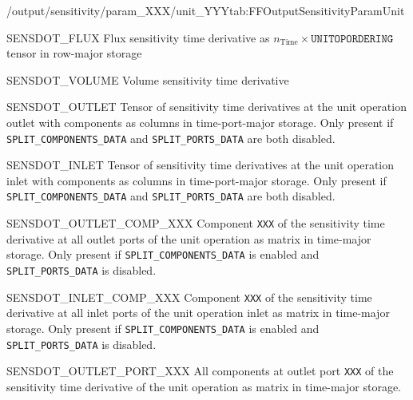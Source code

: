 \begin{groupscope}{/output/sensitivity/param\_XXX/unit\_YYY}{tab:FFOutputSensitivityParamUnit}
  \begin{dataset}[type=double,unit={\si{\mol\per\square\metre\per\square\second\per\ParamUnit}}]{SENSDOT\_FLUX}
    Flux sensitivity time derivative as $n_{\text{Time}} \times \texttt{UNITOPORDERING}$ tensor in row-major storage
  \end{dataset}
  \begin{dataset}[type=double,unit={\si{\cubic\per\second\metre\per\ParamUnit}}]{SENSDOT\_VOLUME}
    Volume sensitivity time derivative 
  \end{dataset}
  \begin{dataset}[type=double,unit={\si{\mol\per\cubic\metre\of{IV}\per\second\per\ParamUnit}}]{SENSDOT\_OUTLET}
    Tensor of sensitivity time derivatives at the unit operation outlet with components as columns in time-port-major storage.
    Only present if \texttt{SPLIT\_COMPONENTS\_DATA} and \texttt{SPLIT\_PORTS\_DATA} are both disabled.
  \end{dataset}
  \begin{dataset}[type=double,unit={\si{\mol\per\cubic\metre\of{IV}\per\second\per\ParamUnit}}]{SENSDOT\_INLET}
    Tensor of sensitivity time derivatives at the unit operation inlet with components as columns in time-port-major storage.
    Only present if \texttt{SPLIT\_COMPONENTS\_DATA} and \texttt{SPLIT\_PORTS\_DATA} are both disabled.
  \end{dataset}
  \begin{dataset}[type=double,unit={\si{\mol\per\cubic\metre\of{IV}\per\second\per\ParamUnit}}]{SENSDOT\_OUTLET\_COMP\_XXX}
    Component \texttt{XXX} of the sensitivity time derivative at all outlet ports of the unit operation as matrix in time-major storage.
    Only present if \texttt{SPLIT\_COMPONENTS\_DATA} is enabled and \texttt{SPLIT\_PORTS\_DATA} is disabled.
  \end{dataset}
  \begin{dataset}[type=double,unit={\si{\mol\per\cubic\metre\of{IV}\per\second\per\ParamUnit}}]{SENSDOT\_INLET\_COMP\_XXX}
    Component \texttt{XXX} of the sensitivity time derivative at all inlet ports of the unit operation inlet as matrix in time-major storage.
    Only present if \texttt{SPLIT\_COMPONENTS\_DATA} is enabled and \texttt{SPLIT\_PORTS\_DATA} is disabled.
  \end{dataset}
  \begin{dataset}[type=double,unit={\si{\mol\per\cubic\metre\of{IV}\per\second\per\ParamUnit}}]{SENSDOT\_OUTLET\_PORT\_XXX}
    All components at outlet port \texttt{XXX} of the sensitivity time derivative of the unit operation as matrix in time-major storage.

\end{dataset}
\end{groupscope}

